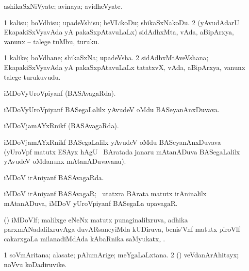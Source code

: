 \bentry
{}
\gl{\nA}
\bmng
ashikaSxNiVyate; avinaya; avidheVyate. 
\emng
\eentry

\bentry
{}
\gl{\sakirx}
\bmng
\bnum
\num{1} kalisu; boVdhisu; upadeVshisu; heVLikoDu; shikaSxNakoDu. 
\num{2} (yAvudAdarU EkapakiSxVyavAda yA pakaSxpAtavuLaLx) sidAdhxMta, vAda, aBipArxya, \mo vanunx -- talege tuMbu, turuku. 
\enum
\emng
\eentry

\bentry
{}
\gl{\nA}
\bmng
\bnum
\num{1} kalike; boVdhane; shikaSxNa; upadeVsha. 
\num{2} sidAdhxMtAveVshana; EkapakiSxVyavAda yA pakaSxpAtavuLaLx tatatxvX, vAda, aBipArxya, \mo vanunx talege turukuvudu. 
\enum
\emng
\eentry

\bentry
{}
\gl{\gu}
\bmng
iMDoVyUroVpiyanf (BASAvagaRda). 
\emng
\eentry

\bentry
{}
\gl{\nA}
\bmng
iMDoVyUroVpiyanf BASegaLalilx yAvudeV oMdu BASeyanAnxDuvava. 
\emng
\eentry

\bentry
{}
\gl{\gu}
\bmng
iMDoVjamAYxRnikf (BASAvagaRda). 
\emng
\eentry

\bentry
{}
\gl{\nA}
\bmng
iMDoVjamAYxRnikf BASegaLalilx yAvudeV oMdu BASeyanAnxDuvava (yUroVpf matutx ESAyx hAgU \kanu\ BAratada janaru mAtanADuva BASegaLalilx yAvudeV oMdanunx mAtanADuvavanu). 
\emng
\eentry

\bentry
{}
\gl{\gu}
\bmng
iMDoV irAniyanf BASAvagaRda. 
\emng
\eentry

\bentry
{}
\gl{\nA}
\bmng
iMDoV irAniyanf BASAvagaR; \kanmu\ utatxra BArata matutx irAninalilx mAtanADuva, iMDoV yUroVpiyanf BASegaLa upavagaR. 
\emng
\eentry

\bentry
{}
\gl{\nA}
\bmng
(\ravi) iMDoVlf; malilxge eNeNx matutx punaginalilxruva, adhika parxmANadalilxruvAga duvARsaneyiMda kUDiruva, benis'Vnf matutx piroVlf  cakarxgaLa milanadiMdAda kAbaRnika saMyukatx, . 
\emng
\eentry

\bentry
{}
\gl{\nA}
\bmng
\bnum
\num{1} soVmAritana; alasate; pAlumArige; meYgaLaLxtana. 
\num{2} (\veYshA) veVdanArAhitayx; noVvu koDadiruvike. 
\enum
\emng
\eentry

